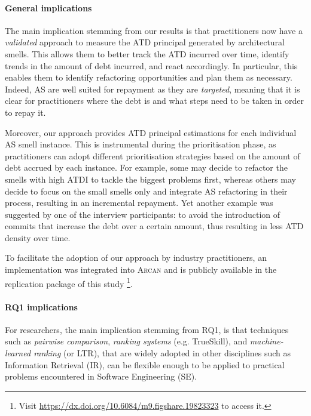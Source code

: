 \paragraph{General implications} The main implication stemming from our results is that practitioners now have a \emph{validated} approach to measure the ATD principal generated by architectural smells.
This allows them to better track the ATD incurred over time, identify trends in the amount of debt incurred, and react accordingly. 
In particular, this enables them to identify refactoring opportunities and plan them as necessary.
Indeed, AS are well suited for repayment as they are \emph{targeted}, meaning that it is clear for practitioners where the debt is and what steps need to be taken in order to repay it.

Moreover, our approach provides ATD principal estimations for each individual AS smell instance. 
This is instrumental during the prioritisation phase, as practitioners can adopt different prioritisation strategies based on the amount of debt accrued by each instance.
For example, some may decide to refactor the smells with high ATDI to tackle the biggest problems first, whereas others may decide to focus on the small smells only and integrate AS refactoring in their process, resulting in an incremental repayment.
Yet another example was suggested by one of the interview participants: to avoid the introduction of commits that increase the debt over a certain amount, thus resulting in less ATD density over time.

To facilitate the adoption of our approach by industry practitioners, an implementation was integrated into \textsc{Arcan} and is publicly available in the replication package of this study \footnote{Visit \url{https://dx.doi.org/10.6084/m9.figshare.19823323} to access it.}.

\paragraph{RQ1 implications}
For researchers, the main implication stemming from RQ1, is that techniques such as \emph{pairwise comparison}, \emph{ranking systems} (e.g. TrueSkill), and \emph{machine-learned ranking} (or LTR), that are widely adopted in other disciplines such as Information Retrieval (IR), can be flexible enough to be applied to practical problems encountered in Software Engineering (SE).

